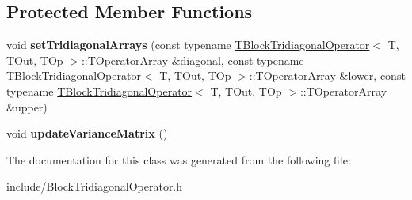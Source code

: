 \subsection*{Protected Member Functions}
\begin{DoxyCompactItemize}
\item 
void {\bfseries set\+Tridiagonal\+Arrays} (const typename \hyperlink{classkl1p_1_1TBlockTridiagonalOperator}{T\+Block\+Tridiagonal\+Operator}$<$ T, T\+Out, T\+Op $>$\+::T\+Operator\+Array \&diagonal, const typename \hyperlink{classkl1p_1_1TBlockTridiagonalOperator}{T\+Block\+Tridiagonal\+Operator}$<$ T, T\+Out, T\+Op $>$\+::T\+Operator\+Array \&lower, const typename \hyperlink{classkl1p_1_1TBlockTridiagonalOperator}{T\+Block\+Tridiagonal\+Operator}$<$ T, T\+Out, T\+Op $>$\+::T\+Operator\+Array \&upper)\hypertarget{classkl1p_1_1TBlockTridiagonalOperator_a169465de5cb9fc91276ad0dc0bdee2a4}{}\label{classkl1p_1_1TBlockTridiagonalOperator_a169465de5cb9fc91276ad0dc0bdee2a4}

\item 
void {\bfseries update\+Variance\+Matrix} ()\hypertarget{classkl1p_1_1TBlockTridiagonalOperator_a88049332216e59bd2eca24484b862f0c}{}\label{classkl1p_1_1TBlockTridiagonalOperator_a88049332216e59bd2eca24484b862f0c}

\end{DoxyCompactItemize}


The documentation for this class was generated from the following file\+:\begin{DoxyCompactItemize}
\item 
include/Block\+Tridiagonal\+Operator.\+h\end{DoxyCompactItemize}
